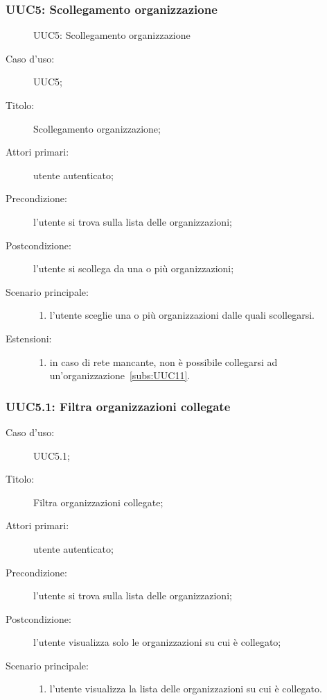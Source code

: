 \documentclass[../../../analisi-dei-requisiti.tex]{subfiles}
\begin{document}
\subsubsection{UUC5: Scollegamento organizzazione}%
\label{subs:UUC5}

\begin{figure}[H]
  \centering
  \caption{UUC5: Scollegamento organizzazione}%
  \label{fig:UUC11}
\end{figure}

\begin{description}
  \item[Caso d’uso:] UUC5;
  \item[Titolo:] Scollegamento organizzazione;
  \item[Attori primari:] utente autenticato;
  \item[Precondizione:] l'utente si trova sulla lista delle organizzazioni;
  \item[Postcondizione:] l'utente si scollega da una o più organizzazioni;
  \item[Scenario principale:]
        \begin{enumerate}
          \item l'utente sceglie una o più organizzazioni dalle quali scollegarsi.
        \end{enumerate}
  \item[Estensioni:]
        \begin{enumerate}
          \item in caso di rete mancante, non è possibile collegarsi ad un'organizzazione~\ref{subs:UUC11}.
        \end{enumerate}
\end{description}


\subsubsection{UUC5.1: Filtra organizzazioni collegate}%
\label{subs:UUC5.1}
\begin{description}
  \item[Caso d’uso:] UUC5.1;
  \item[Titolo:] Filtra organizzazioni collegate;
  \item[Attori primari:] utente autenticato;
  \item[Precondizione:] l'utente si trova sulla lista delle organizzazioni;
  \item[Postcondizione:] l'utente visualizza solo le organizzazioni su cui è collegato;
  \item[Scenario principale:]
        \begin{enumerate}
          \item l'utente visualizza la lista delle organizzazioni su cui è collegato.
        \end{enumerate}
\end{description}
\end{document}
